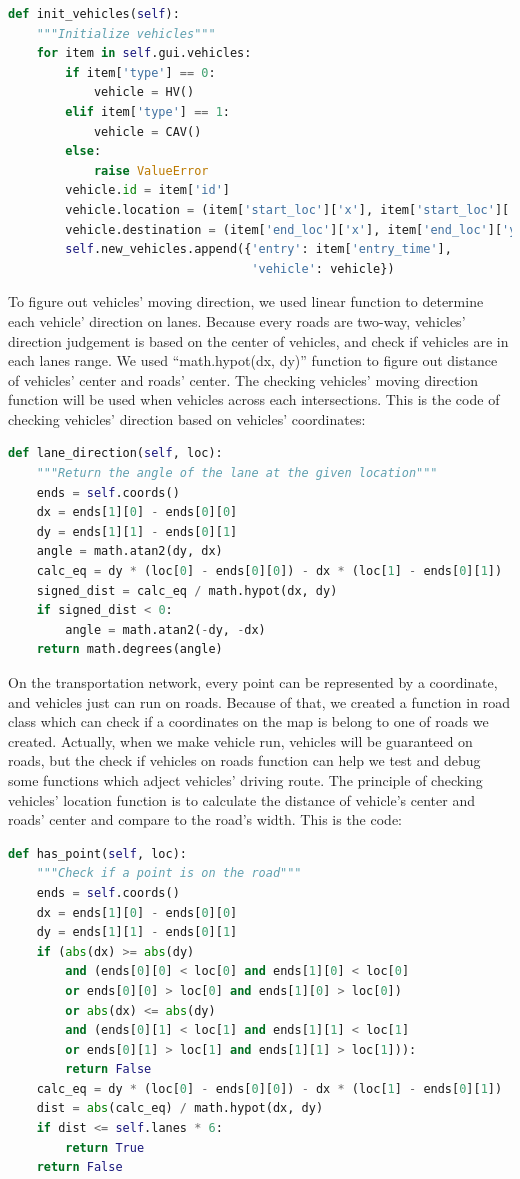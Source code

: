 \documentclass[onecolumn, draftclsnofoot,10pt, compsoc]{IEEEtran}
\begin{document}
\begin{lstlisting}[language=Python]
def init_vehicles(self):
    """Initialize vehicles"""
    for item in self.gui.vehicles:
        if item['type'] == 0:
            vehicle = HV()
        elif item['type'] == 1:
            vehicle = CAV()
        else:
            raise ValueError
        vehicle.id = item['id']
        vehicle.location = (item['start_loc']['x'], item['start_loc']['y'])
        vehicle.destination = (item['end_loc']['x'], item['end_loc']['y'])
        self.new_vehicles.append({'entry': item['entry_time'],
                                  'vehicle': vehicle})
\end{lstlisting}
To figure out vehicles’ moving direction, we used linear function to determine each vehicle’ direction on lanes. Because every roads are two-way, vehicles’ direction judgement is based on the center of vehicles, and check if vehicles are in each lanes range. We used “math.hypot(dx, dy)” function to figure out distance of vehicles’ center and roads’ center. The checking vehicles’ moving direction function will be used when vehicles across each intersections. This is the code of checking vehicles’ direction based on vehicles’ coordinates:
\begin{lstlisting}[language=Python]
def lane_direction(self, loc):
    """Return the angle of the lane at the given location"""
    ends = self.coords()
    dx = ends[1][0] - ends[0][0]
    dy = ends[1][1] - ends[0][1]
    angle = math.atan2(dy, dx)
    calc_eq = dy * (loc[0] - ends[0][0]) - dx * (loc[1] - ends[0][1])
    signed_dist = calc_eq / math.hypot(dx, dy)
    if signed_dist < 0:
        angle = math.atan2(-dy, -dx)
    return math.degrees(angle)
\end{lstlisting}
On the transportation network, every point can be represented by a coordinate, and vehicles just can run on roads. Because of that, we created a function in road class which can check if a coordinates on the map is belong to one of roads we created. Actually, when we make vehicle run, vehicles will be guaranteed on roads, but the check if vehicles on roads function can help we test and debug some functions which adject vehicles’ driving route. The principle of checking vehicles’ location function is to calculate the distance of vehicle’s center and roads’ center and compare to the road’s width. This is the code:
\begin{lstlisting}[language=Python]
def has_point(self, loc):
    """Check if a point is on the road"""
    ends = self.coords()
    dx = ends[1][0] - ends[0][0]
    dy = ends[1][1] - ends[0][1]
    if (abs(dx) >= abs(dy)
        and (ends[0][0] < loc[0] and ends[1][0] < loc[0]
        or ends[0][0] > loc[0] and ends[1][0] > loc[0])
        or abs(dx) <= abs(dy)
        and (ends[0][1] < loc[1] and ends[1][1] < loc[1]
        or ends[0][1] > loc[1] and ends[1][1] > loc[1])):
        return False
    calc_eq = dy * (loc[0] - ends[0][0]) - dx * (loc[1] - ends[0][1])
    dist = abs(calc_eq) / math.hypot(dx, dy)
    if dist <= self.lanes * 6:
        return True
    return False
\end{lstlisting}
\end{document}
